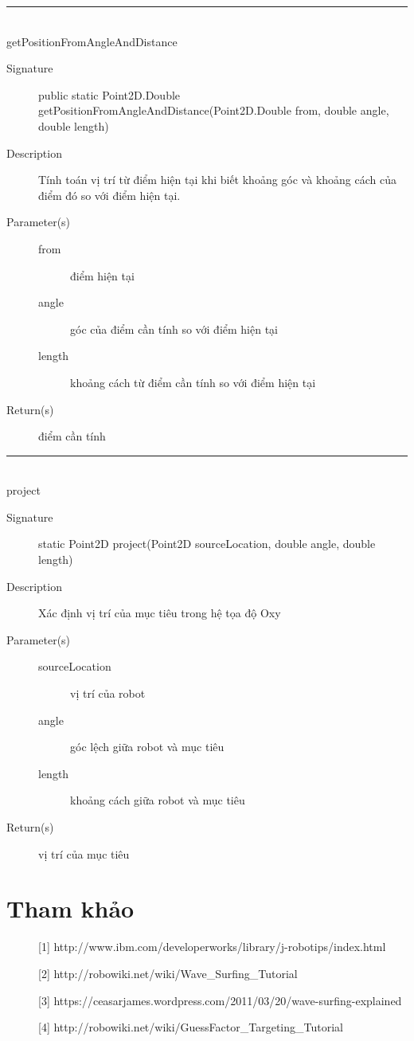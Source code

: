 \documentclass[14pt]{article}
\newcommand{\sep}{\rule{\textwidth}{0.007pt}\\}
\begin{document}
\sep
getPositionFromAngleAndDistance
\begin{description}
	\item[Signature]public static Point2D.Double getPositionFromAngleAndDistance(Point2D.Double from,
			double angle, double length)
	\item[Description] Tính toán vị trí từ điểm hiện tại khi biết khoảng góc và khoảng cách của điểm đó so với điểm hiện tại.
	\item[Parameter(s)]
	\begin{description}
		\item[from] điểm hiện tại
		\item[angle] góc của điểm cần tính so với điểm hiện tại
		\item[length] khoảng cách từ điểm cần tính so với điểm hiện tại
	\end{description}
	\item[Return(s)] điểm cần tính
\end{description}
\sep
project
\begin{description}
	\item[Signature] static Point2D project(Point2D sourceLocation, double angle, double length)
	\item[Description] Xác định vị trí của mục tiêu trong hệ tọa độ Oxy
	\item[Parameter(s)]
	\begin{description}
		\item[sourceLocation] vị trí của robot
		\item[angle] góc lệch giữa robot và mục tiêu
		\item[length] khoảng cách giữa robot và mục tiêu
	\end{description}
	\item[Return(s)] vị trí của mục tiêu
\end{description}
\section{Tham khảo}
\begin{description}
	\item[][1] http://www.ibm.com/developerworks/library/j-robotips/index.html
	\item[][2] http://robowiki.net/wiki/Wave\_Surfing\_Tutorial
	\item[][3] https://ceasarjames.wordpress.com/2011/03/20/wave-surfing-explained
	\item[][4] http://robowiki.net/wiki/GuessFactor\_Targeting\_Tutorial
\end{description}
\end{document}
